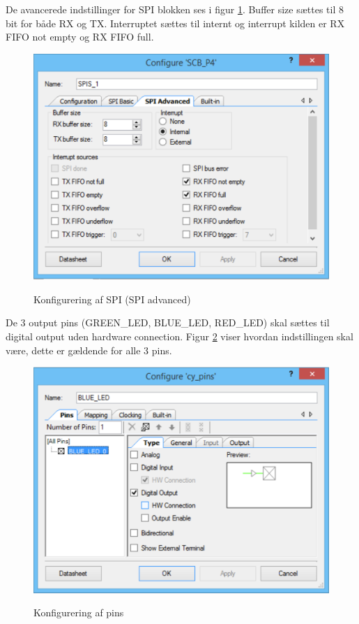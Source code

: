 De avancerede indstillinger for SPI blokken ses i figur \ref{lab:spi_advanced_config}. Buffer size sættes til 8 bit for både RX og TX. Interruptet sættes til internt og interrupt kilden er RX FIFO not empty og RX FIFO full.
\begin{figure}[H] \centering
{\includegraphics[width=\textwidth]{filer/implementering/spi/spi_handler_topdesign_spi_advanced}}
\caption{Konfigurering af SPI (SPI advanced)}
\label{lab:spi_advanced_config}
\raggedright
\end{figure}



De 3 output pins (GREEN\_LED, BLUE\_LED, RED\_LED) skal sættes til digital output uden hardware connection.
Figur \ref{lab:led_pins_config} viser hvordan indstillingen skal være, dette er gældende for alle 3 pins. 

\begin{figure}[H] \centering
{\includegraphics[width=\textwidth]{filer/implementering/spi/spi_handler_topdesign_led}}
\caption{Konfigurering af pins}
\label{lab:led_pins_config}
\raggedright
\end{figure}



